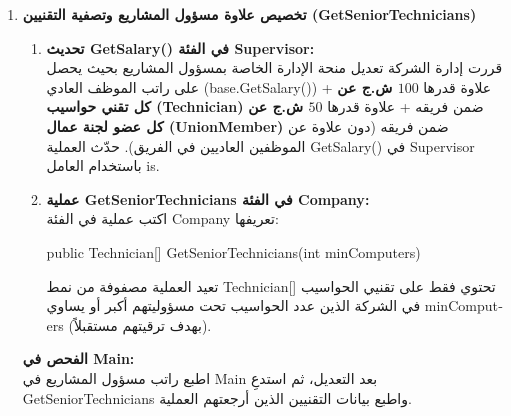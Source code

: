 \documentclass[14pt]{extarticle}
\begin{document}
\begin{enumerate}[label=\textbf{تمرين \arabic*:}, wide=0pt, itemsep=2.2em]

    \item \textbf{تخصيص علاوة مسؤول المشاريع وتصفية التقنيين (\textenglish{GetSeniorTechnicians})}
    \begin{enumerate}[label=\textbf{(\arabic*)}]
        \item \textbf{تحديث \textenglish{GetSalary()} في الفئة \textenglish{Supervisor}:} \\
        قررت إدارة الشركة تعديل منحة الإدارة الخاصة بمسؤول المشاريع بحيث يحصل على راتب الموظف العادي (\textenglish{base.GetSalary()}) + علاوة قدرها \textbf{$100$ ش.ج عن كل تقني حواسيب (\textenglish{Technician})} ضمن فريقه + علاوة قدرها \textbf{$50$ ش.ج عن كل عضو لجنة عمال (\textenglish{UnionMember})} ضمن فريقه (دون علاوة عن الموظفين العاديين في الفريق). حدّث العملية \textenglish{GetSalary()} في \textenglish{Supervisor} باستخدام العامل \textenglish{is}.
        \item \textbf{عملية \textenglish{GetSeniorTechnicians} في الفئة \textenglish{Company}:} \\
        اكتب عملية في الفئة \textenglish{Company} تعريفها:
        \begin{center}
        \textenglish{public Technician[] GetSeniorTechnicians(int minComputers)}
        \end{center}
        تعيد العملية مصفوفة من نمط \textenglish{Technician[]} تحتوي فقط على تقنيي الحواسيب في الشركة الذين عدد الحواسيب تحت مسؤوليتهم أكبر أو يساوي \textenglish{minComputers} (بهدف ترقيتهم مستقبلاً).
    \end{enumerate}
    \textbf{الفحص في \textenglish{Main}:} \\
    اطبع راتب مسؤول المشاريع في \textenglish{Main} بعد التعديل، ثم استدعِ \textenglish{GetSeniorTechnicians} واطبع بيانات التقنيين الذين أرجعتهم العملية.
    \filbreak


\end{enumerate}
\end{document}

